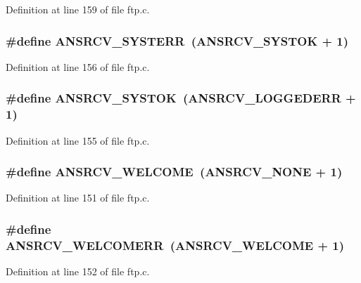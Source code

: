 Definition at line 159 of file ftp.c.

\hypertarget{group__ftp_ga91b65b8976afb7231704b61d08ae0ce9}{
\subsubsection[{ANSRCV\_\-SYSTERR}]{\setlength{\rightskip}{0pt plus 5cm}\#define ANSRCV\_\-SYSTERR~(ANSRCV\_\-SYSTOK + 1)}}
\label{group__ftp_ga91b65b8976afb7231704b61d08ae0ce9}


Definition at line 156 of file ftp.c.

\hypertarget{group__ftp_ga329baca85e9f8b3b9821fa0395590f40}{
\subsubsection[{ANSRCV\_\-SYSTOK}]{\setlength{\rightskip}{0pt plus 5cm}\#define ANSRCV\_\-SYSTOK~(ANSRCV\_\-LOGGEDERR + 1)}}
\label{group__ftp_ga329baca85e9f8b3b9821fa0395590f40}


Definition at line 155 of file ftp.c.

\hypertarget{group__ftp_ga18ecbf05891a39d2a3f8890a338c8ec6}{
\subsubsection[{ANSRCV\_\-WELCOME}]{\setlength{\rightskip}{0pt plus 5cm}\#define ANSRCV\_\-WELCOME~(ANSRCV\_\-NONE + 1)}}
\label{group__ftp_ga18ecbf05891a39d2a3f8890a338c8ec6}


Definition at line 151 of file ftp.c.

\hypertarget{group__ftp_ga6fd95b3152bece39bd3f3183db675bfb}{
\subsubsection[{ANSRCV\_\-WELCOMERR}]{\setlength{\rightskip}{0pt plus 5cm}\#define ANSRCV\_\-WELCOMERR~(ANSRCV\_\-WELCOME + 1)}}
\label{group__ftp_ga6fd95b3152bece39bd3f3183db675bfb}


Definition at line 152 of file ftp.c.

